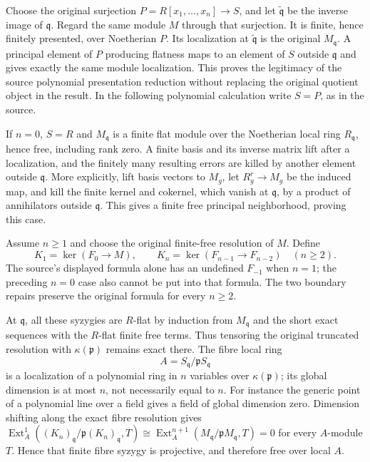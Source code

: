 Choose the original surjection \(P=R[x_1,\ldots,x_n]\to S\), and let \(\widetilde{\mathfrak q}\) be the inverse image of \(\mathfrak q\). Regard the same module \(M\) through that surjection. It is finite, hence finitely presented, over Noetherian \(P\). Its localization at \(\widetilde{\mathfrak q}\) is the original \(M_{\mathfrak q}\). A principal element of \(P\) producing flatness maps to an element of \(S\) outside \(\mathfrak q\) and gives exactly the same module localization. This proves the legitimacy of the source polynomial presentation reduction without replacing the original quotient object in the result. In the following polynomial calculation write \(S=P\), as in the source.

If \(n=0\), \(S=R\) and \(M_{\mathfrak q}\) is a finite flat module over the Noetherian local ring \(R_{\mathfrak q}\), hence free, including rank zero. A finite basis and its inverse matrix lift after a localization, and the finitely many resulting errors are killed by another element outside \(\mathfrak q\). More explicitly, lift basis vectors to \(M_g\), let \(R_g^r\to M_g\) be the induced map, and kill the finite kernel and cokernel, which vanish at \(\mathfrak q\), by a product of annihilators outside \(\mathfrak q\). This gives a finite free principal neighborhood, proving this case.

Assume \(n\geq1\) and choose the original finite-free resolution of \(M\). Define \[
K_1=\ker(F_0\to M),\qquad
K_n=\ker(F_{n-1}\to F_{n-2})\quad(n\geq2).
\] The source's displayed formula alone has an undefined \(F_{-1}\) when \(n=1\); the preceding \(n=0\) case also cannot be put into that formula. The two boundary repairs preserve the original formula for every \(n\geq2\).

At \(\mathfrak q\), all these syzygies are \(R\)-flat by induction from \(M_{\mathfrak q}\) and the short exact sequences with the \(R\)-flat finite free terms. Thus tensoring the original truncated resolution with \(\kappa(\mathfrak p)\) remains exact there. The fibre local ring \[
A=S_{\mathfrak q}/\mathfrak pS_{\mathfrak q}
\] is a localization of a polynomial ring in \(n\) variables over \(\kappa(\mathfrak p)\); its global dimension is at most \(n\), not necessarily equal to \(n\). For instance the generic point of a polynomial line over a field gives a field of global dimension zero. Dimension shifting along the exact fibre resolution gives \(\operatorname{Ext}_A^1((K_n)_{\mathfrak q}/\mathfrak p(K_n)_{\mathfrak q},T)
\cong\operatorname{Ext}_A^{n+1}(M_{\mathfrak q}/\mathfrak pM_{\mathfrak q},T)=0\) for every \(A\)-module \(T\). Hence that finite fibre syzygy is projective, and therefore free over local \(A\).

